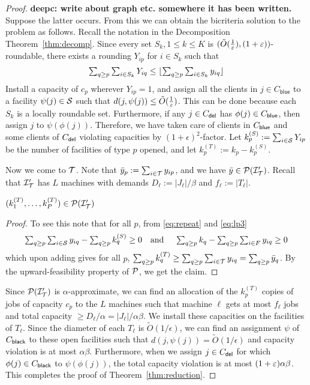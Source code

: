 \begin{proof}{\bf deepc: write about graph etc. somewhere it has been written.}
Suppose the latter occurs. From this we can obtain the bicriteria solution to the \mckc problem as follows. 
Recall the notation in the Decomposition Theorem~\ref{thm:decomp}. Since every set $S_k, 1\leq k\leq K$ is $(\tilde{O}(\frac{1}{\varepsilon}),(1+\varepsilon))$-roundable, there exists a rounding $Y_{ip}$ for $i\in S_k$  such that
\begin{equation}\label{eq:repeat}
\textstyle \sum_{q\geq p} \sum_{i\in S_k} Y_{iq} \leq \lfloor\sum_{q\geq p} \sum_{i\in S_k} y_{iq}\rfloor 
\end{equation}
Install a capacity of $c_p$ wherever $Y_{ip} = 1$, and assign all the clients in $j\in C_\mathsf{blue}$ to a facility $\psi(j) \in {\cal S}$ such that $d(j,\psi(j)) \leq \tilde{O}(\frac{1}{\varepsilon})$. This can be done because each $S_k$ is a locally roundable set.
Furthermore, if any $j\in C_{\mathsf{del}}$ has $\phi(j) \in C_{\mathsf{blue}}$, then assign $j$ to $\psi(\phi(j))$. Therefore, we have taken care of clients in $C_{\mathsf{blue}}$ and some clients of $C_{\mathsf{del}}$ violating capacities by $(1+\epsilon)^2$-factor.
Let $k^{(S)}_p := \sum_{i\in {\cal S}} Y_{ip}$ be the number of facilities of type $p$ opened, and let $k^{(T)}_p := k_p - k^{(S)}_p$.

Now we come to ${\cal T}$. Note that $\bar{y}_p := \sum_{i\in {\cal T}} y_{ip}$, and we have $\bar{y} \in {\cal P}({\cal I}'_{\cal T})$. Recall that ${\cal I}'_{\cal T}$ has $L$ machines with demands $D_\ell := |J_\ell|/\beta$ and $f_\ell := |T_\ell|$.
\begin{claim}
	$(k^{(T)}_1,\ldots, k^{(T)}_P) \in {\cal P}({\cal I}'_{\cal T})$
\end{claim}
\begin{proof}To see this note that for all $p$, from \eqref{eq:repeat} and \eqref{eq:lp3}
\[
\textstyle \sum_{q\ge p} \sum_{i\in {\cal S}} y_{iq} - \sum_{q\geq p} k^{(S)}_q \geq 0 ~~~\textrm{and} ~~~~ \sum_{q\geq p} k_q - \sum_{q\ge p}\sum_{i\in F} y_{iq} \geq 0
\]
which upon adding gives for all $p$, $\sum_{q\geq p} k^{(T)}_q \geq \sum_{q\ge p} \sum_{i\in {\cal T}} y_{iq} = \sum_{q\geq p} \bar{y}_q$.
By the upward-feasibility property of ${\cal P}$, we get the claim.
\end{proof}
Since ${\cal P}({\cal I}'_{\cal T})$ is $\alpha$-approximate, we can find an allocation of the $k^{(T)}_p$ copies of jobs of capacity $c_p$ to the $L$ machines such that machine $\ell$ gets at most $f_\ell$ jobs
and total capacity $\geq D_\ell/\alpha = |J_\ell|/\alpha\beta$. We install these capacities on the facilities of $T_\ell$. Since the diameter of each $T_\ell$ is $\tilde{O}(1/\epsilon)$, we can find an assignment $\psi$ 
of $C_{\mathsf{black}}$ to these open facilities such that $d(j,\psi(j)) = \tilde{O}(1/\epsilon)$ and capacity violation is at most $\alpha\beta$. Furthermore, when we assign $j\in C_{\mathsf{del}}$ for which $\phi(j) \in C_{\mathsf{black}}$ to $\psi(\phi(j))$, 
the total capacity violation is at most $(1+\varepsilon)\alpha\beta$. 
This completes the proof of Theorem~\ref{thm:reduction}.
\end{proof}
